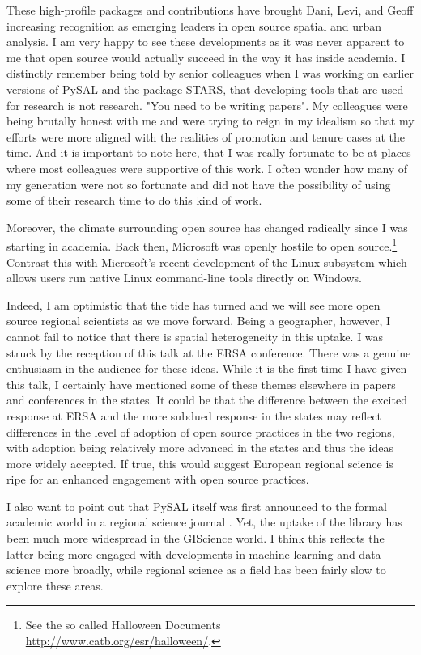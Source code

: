 \documentclass[11pt]{article}
\begin{document}
These high-profile packages and contributions have brought Dani, Levi, and
Geoff increasing recognition as emerging leaders in open source spatial and
urban analysis. I am very happy to see these developments as it was never
apparent to me that open source would actually succeed in the way it has inside
academia. I distinctly remember being told by senior colleagues when I was
working on earlier versions of PySAL and the package STARS, that developing
tools that are used for research is not research. "You need to be writing
papers". My colleagues were being brutally honest with me and were trying to
reign in my idealism so that my efforts were more aligned with the realities of
promotion and tenure cases at the time. And it is important to note here, that
I was really fortunate to be at places where most colleagues were supportive of
this work. I often wonder how many of my generation were not so fortunate and
did not have the possibility of using some of their research time to do this
kind of work.

Moreover, the climate surrounding open source has changed radically since I was
starting in academia. Back then, Microsoft was openly hostile to open
source.\footnote{See the so called Halloween Documents \url{http://www.catb.org/esr/halloween/}.} Contrast this with Microsoft's recent development of the
Linux subsystem which allows users run native Linux command-line tools directly
on Windows. %


Indeed, I am optimistic that the tide has turned and we will see more open
source regional scientists as we move forward. Being a geographer, however, I
cannot fail to notice that there is spatial heterogeneity in this uptake. I was
struck by the reception of this talk at the ERSA conference. There was a
genuine enthusiasm in the audience for these ideas. While it is the first time
I have given this talk, I certainly have mentioned some of these themes elsewhere
in papers \citep{Rey17_codeastext,rey_open_2014,Rey_2009} and conferences in the
states. It could be that the difference between the excited response at ERSA
and the more subdued response in the states may reflect differences in the
level of adoption of open source practices in the two regions, with adoption
being relatively more advanced in the states and thus the ideas more widely
accepted. If true, this would suggest European regional science is ripe for an
enhanced engagement with open source practices.

I also want to point out that PySAL itself was first announced to the formal
academic world in a regional science journal \citep{rey_pysal:_2007-3}. Yet,
the uptake of the library has been much more widespread in the GIScience world.
I think this reflects the latter being more engaged with developments in
machine learning and data science more broadly, while regional science as a
field has been fairly slow to explore these areas.
\end{document}
